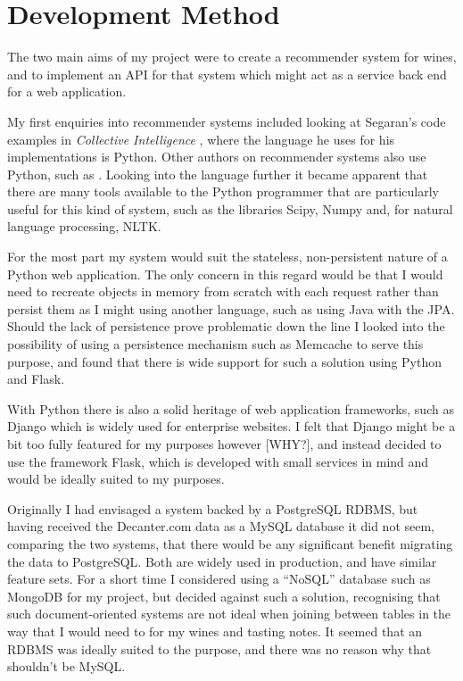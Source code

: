 \section{Development Method}\label{method}

The two main aims of my project were to create a recommender system for wines, and to implement an API for that system which might act as a service back end for a web application.


My first enquiries into recommender systems included looking at Segaran's code examples in \textit{Collective Intelligence} \cite{Segaran07}, where the language he uses for his implementations is Python. Other authors on recommender systems also use Python, such as \cite{CitationNeeded}. Looking into the language further it became apparent that there are many tools available to the Python programmer that are particularly useful for this kind of system, such as the libraries Scipy\cite{Scipy}, Numpy\cite{Numpy} and, for natural language processing, NLTK\cite{NLTK}.

For the most part my system would suit the stateless, non-persistent nature of a Python web application. The only concern in this regard would be that I would need to recreate objects in memory from scratch with each request rather than persist them as I might using another language, such as using Java with the JPA\cite{JavaJPA}. Should the lack of persistence prove problematic down the line I looked into the possibility of using a persistence mechanism such as Memcache\cite{Memcache} to serve this purpose, and found that there is wide support for such a solution using Python and Flask\cite{MemcacheFlaskSupport}.

With Python there is also a solid heritage of web application frameworks, such as Django\cite{Django} which is widely used for enterprise websites. I felt that Django might be a bit too fully featured for my purposes however [WHY?], and instead decided to use the framework Flask\cite{Flask}, which is developed with small services in mind and would be ideally suited to my purposes.


Originally I had envisaged a system backed by a PostgreSQL\cite{PostgreSQL} RDBMS, but having received the Decanter.com data as a MySQL\cite{MySQL} database it did not seem, comparing the two systems, that there would be any significant benefit migrating the data to PostgreSQL. Both are widely used in production, and have similar feature sets. For a short time I considered using a ``NoSQL'' database such as MongoDB\cite{MongoDB} for my project, but decided against such a solution, recognising that such document-oriented systems are not ideal when joining between tables in the way that I would need to for my wines and tasting notes. It seemed that an RDBMS was ideally suited to the purpose, and there was no reason why that shouldn't be MySQL.

